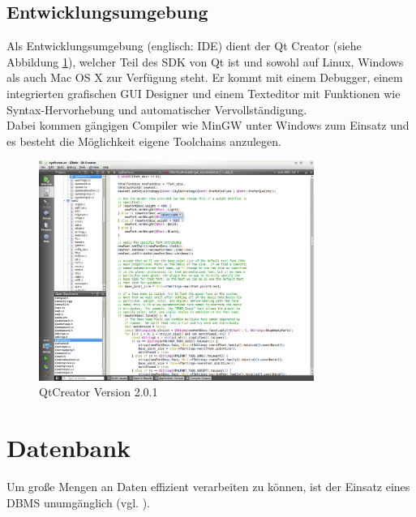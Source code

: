 \subsection{Entwicklungsumgebung}
Als Entwicklungsumgebung (englisch: \ac{IDE}) dient der Qt Creator (siehe Abbildung \ref{QtCreator}), welcher Teil des \ac{SDK} von Qt ist und sowohl auf Linux, Windows als auch Mac OS X zur Verfügung steht. Er kommt mit einem Debugger, einem integrierten grafischen \ac{GUI} Designer und einem Texteditor mit Funktionen wie Syntax-Hervorhebung und automatischer Vervollständigung. \\
Dabei kommen gängigen Compiler wie MinGW unter Windows zum Einsatz und es besteht die Möglichkeit eigene Toolchains anzulegen. \\

\begin{figure}[h]
\begin{center}
\includegraphics[width=0.8\textwidth]{img/general/QtCreator.png}
\caption{QtCreator Version 2.0.1}
\label{QtCreator}
\end{center}
\end{figure}
\newpage


\section{Datenbank}
\label{section_Datenbank}

Um große Mengen an Daten effizient verarbeiten zu können, ist der Einsatz eines \ac{DBMS} unumgänglich (vgl. \citep{saake2010datenbanken}).

